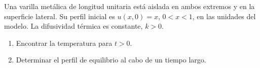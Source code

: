 Una varilla metálica de longitud unitaria está aislada en ambos extremos y en la superficie
lateral. Su perfil inicial es \(u(x,0)=x\), \(0<x<1\), en las unidades del modelo.
La difusividad térmica es constante, \(k>0\).

\begin{enumerate}[label=(\alph*),ref=\alph*,leftmargin=*]
\item Encontrar la temperatura para \(t>0\).
\item Determinar el perfil de equilibrio al cabo de un tiempo largo.
\end{enumerate}
